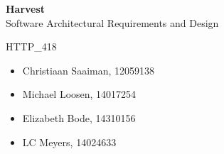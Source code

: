 \documentclass[11pt,fleqn]{book} %
\begin{document}
	
	
	\begingroup
	\thispagestyle{empty}
	\centering
	\vspace*{5cm}
	\par\normalfont\fontsize{35}{35}\sffamily\selectfont
	\textbf{Harvest}\\
	{\LARGE Software Architectural Requirements and Design}\par %
	\vspace*{0.5cm}
	{\Huge HTTP\_418}\par
	\centering
	\vspace*{0.5cm}
	\begin{itemize}[label={}, noitemsep]	
		\Large
		\item \begin{center} Christiaan Saaiman, 12059138 \end{center}
		\item \begin{center} Michael Loosen, 14017254 \end{center}
		\item \begin{center} Elizabeth Bode, 14310156 \end{center}
		\item \begin{center} LC Meyers, 14024633 \end{center}	
	\end{itemize}
	\endgroup
	
	
	
	\pagestyle{empty} %
	
	\tableofcontents %
	
	
	\pagestyle{fancy} %
	
	
\end{document}
